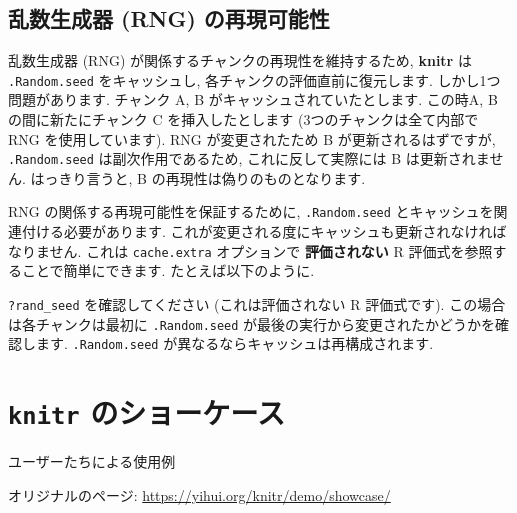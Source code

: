 \documentclass[
  lualatex,ja=standard,jafont=noto-otf]{bxjsreport}
\newenvironment{Shaded}{\begin{snugshade}}{\end{snugshade}}
\newcommand{\AttributeTok}[1]{\textcolor[rgb]{0.77,0.63,0.00}{#1}}
\newcommand{\FunctionTok}[1]{\textcolor[rgb]{0.00,0.00,0.00}{#1}}
\newcommand{\NormalTok}[1]{#1}
\newcommand{\SpecialCharTok}[1]{\textcolor[rgb]{0.00,0.00,0.00}{#1}}
\begin{document}
\hypertarget{ux4e71ux6570ux751fux6210ux5668-rng-ux306eux518dux73feux53efux80fdux6027}{%
\section*{乱数生成器 (RNG)
の再現可能性}\label{ux4e71ux6570ux751fux6210ux5668-rng-ux306eux518dux73feux53efux80fdux6027}}

乱数生成器 (RNG) が関係するチャンクの再現性を維持するため,
\textbf{knitr} は \texttt{.Random.seed} をキャッシュし,
各チャンクの評価直前に復元します. しかし1つ問題があります. チャンク A, B
がキャッシュされていたとします. この時A, B の間に新たにチャンク C
を挿入したとします (3つのチャンクは全て内部で RNG を使用しています). RNG
が変更されたため B が更新されるはずですが, \texttt{.Random.seed}
は副次作用であるため, これに反して実際には B は更新されません.
はっきり言うと, B の再現性は偽りのものとなります.

RNG の関係する再現可能性を保証するために, \texttt{.Random.seed}
とキャッシュを関連付ける必要があります.
これが変更される度にキャッシュも更新されなければなりません. これは
\texttt{cache.extra} オプションで \textbf{評価されない} R
評価式を参照することで簡単にできます. たとえば以下のように.

\begin{Shaded}
\end{Shaded}

\texttt{?rand\_seed} を確認してください (これは評価されない R
評価式です). この場合は各チャンクは最初に \texttt{.Random.seed}
が最後の実行から変更されたかどうかを確認します. \texttt{.Random.seed}
が異なるならキャッシュは再構成されます.

\hypertarget{showcase}{%
\chapter*{\texorpdfstring{\texttt{knitr}
のショーケース}{knitr のショーケース}}\label{showcase}}

ユーザーたちによる使用例

オリジナルのページ: \url{https://yihui.org/knitr/demo/showcase/}
\end{document}
